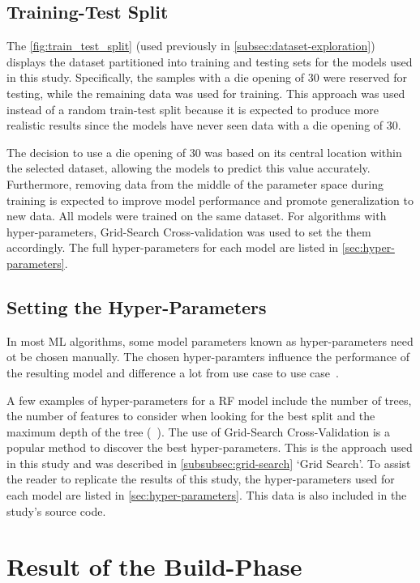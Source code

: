 \subsection{Training-Test Split}\label{subsec:training-test-split}
The \cref{fig:train_test_split} (used previously in \cref{subsec:dataset-exploration}) displays the dataset
partitioned into training and testing sets for the models used in this study.
Specifically, the samples with a die opening of 30 were reserved for testing, while the remaining data was used for
training.
This approach was used instead of a random train-test split because it is expected to produce
more realistic results since the models have never seen data with a die opening of 30.

The decision to use a die opening of 30 was based on its central location within the selected dataset, allowing the
models to predict this value accurately.
Furthermore, removing data from the middle of the parameter space during
training is expected to improve model performance and promote generalization to new data.
All models were trained on the same dataset.
For algorithms with hyper-parameters, Grid-Search Cross-validation was used to set the them accordingly.
The full hyper-parameters for each model are listed in \cref{sec:hyper-parameters}.

\subsection{Setting the Hyper-Parameters}\label{subsec:hyper-parameters}
In most \ac{ML} algorithms, some model parameters known as hyper-parameters need ot be chosen manually.
The chosen hyper-paramters influence the performance of the resulting model and difference a lot from use
case to use case~\cite[p. 1]{probst2019tunability}.

A few examples of hyper-parameters for a \ac{RF} model include the number of trees, the number
of features to consider when looking for the best split and the maximum depth of the tree
(~\cite{scikit-learn}).
The use of Grid-Search Cross-Validation is a popular method to discover the best hyper-parameters.
This is the approach used in this study and was described in \cref{subsubsec:grid-search} `Grid Search'.
To assist the reader to replicate the results of this study, the hyper-parameters used for each model are listed  in
\cref{sec:hyper-parameters}.
This data is also included in the study's source code.


\section{Result of the Build-Phase}\label{sec:results-build-phase}


